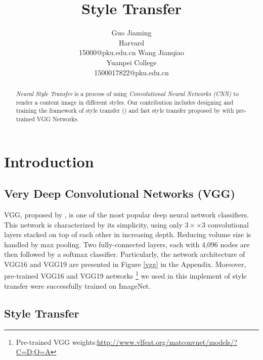\documentclass{article} %
\title{Style Transfer}
\author{Guo Jiaming\\
Harvard\\
{15000@pku.edu.cn}
\And
Wang Jianqiao\\
Yuanpei College\\
{1500017822@pku.edu.cn}
}
\begin{document}

\maketitle

\begin{abstract}
\emph{Neural Style Transfer} is a process of using \emph{Convolutional Neural Networks (CNN)} to render a content image in different styles. Our contribution includes designing and training the framework of style transfer (\cite{1508.06576}) and fast style transfer proposed by \cite{1603.08155} with pre-trained VGG Networks.
\end{abstract}

\section{Introduction}


\subsection{Very Deep Convolutional Networks (VGG)}
VGG, proposed by \cite{1409.1556}, is one of the most popular deep neural network classifiers. This network is characterized by its simplicity, using only $3×\times3$ convolutional layers stacked on top of each other in increasing depth. Reducing volume size is handled by max pooling. Two fully-connected layers, each with 4,096 nodes are then followed by a softmax classifier. Particularly, the network architecture of VGG16 and VGG19 are presented in Figure \ref{vgg} in the Appendix. Moreover, pre-trained VGG16 and VGG19 networks \footnote{Pre-trained VGG weights:\url{http://www.vlfeat.org/matconvnet/models/?C=D;O=A}} we used in this implement of style transfer were successfully trained on ImageNet.

\subsection{Style Transfer}
\end{document}
